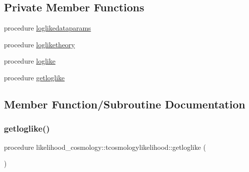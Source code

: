 \subsection*{Private Member Functions}
\begin{DoxyCompactItemize}
\item 
procedure \mbox{\hyperlink{structlikelihood__cosmology_1_1tcosmologylikelihood_a2aa259d5cdecea1809292604236c9b48}{loglikedataparams}}
\item 
procedure \mbox{\hyperlink{structlikelihood__cosmology_1_1tcosmologylikelihood_abb60a06bbb8c7f15c15534cb4e1bfb29}{logliketheory}}
\item 
procedure \mbox{\hyperlink{structlikelihood__cosmology_1_1tcosmologylikelihood_a495d3357b1db3ebbd3897f533175778b}{loglike}}
\item 
procedure \mbox{\hyperlink{structlikelihood__cosmology_1_1tcosmologylikelihood_a439bd5bb0951863820f32ae76dba7086}{getloglike}}
\end{DoxyCompactItemize}


\subsection{Member Function/\+Subroutine Documentation}
\mbox{\label{structlikelihood__cosmology_1_1tcosmologylikelihood_a439bd5bb0951863820f32ae76dba7086}} 
\subsubsection{\texorpdfstring{getloglike()}{getloglike()}}
{\footnotesize\ttfamily procedure likelihood\+\_\+cosmology\+::tcosmologylikelihood\+::getloglike (\begin{DoxyParamCaption}{ }\end{DoxyParamCaption})\hspace{0.3cm}{\ttfamily [private]}}

\mbox{\label{structlikelihood__cosmology_1_1tcosmologylikelihood_a495d3357b1db3ebbd3897f533175778b}} 
